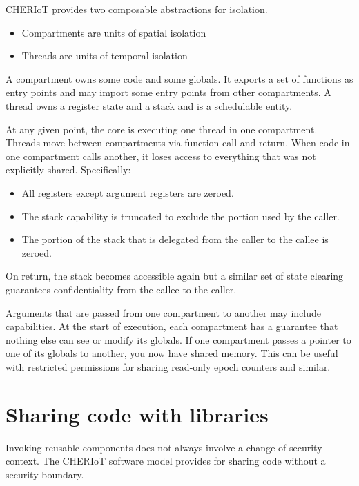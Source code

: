 CHERIoT provides two composable abstractions for isolation.

\begin{itemize}
	\item{Compartments are units of spatial isolation}
	\item{Threads are units of temporal isolation}
\end{itemize}

A compartment owns some code and some globals.
It exports a set of functions as entry points and may import some entry points from other compartments.
A thread owns a register state and a stack and is a schedulable entity.

At any given point, the core is executing one thread in one compartment.
Threads move between compartments via function call and return.
When code in one compartment calls another, it loses access to everything that was not explicitly shared.
Specifically:

\begin{itemize}
	\item{All registers except argument registers are zeroed.}
	\item{The stack capability is truncated to exclude the portion used by the caller.}
	\item{The portion of the stack that is delegated from the caller to the callee is zeroed.}
\end{itemize}

On return, the stack becomes accessible again but a similar set of state clearing guarantees confidentiality from the callee to the caller.

Arguments that are passed from one compartment to another may include capabilities.
At the start of execution, each compartment has a guarantee that nothing else can see or modify its globals.
If one compartment passes a pointer to one of its globals to another, you now have shared memory.
This can be useful with restricted permissions for sharing read-only epoch counters and similar.

\section[label=libraries]{Sharing code with libraries}

Invoking reusable components does not always involve a change of security context.
The CHERIoT software model provides  for sharing code without a security boundary.

